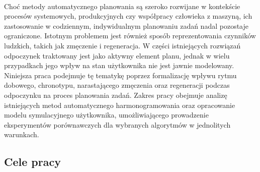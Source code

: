 \\\indent Choć metody automatycznego planowania są szeroko rozwijane w kontekście procesów systemowych, produkcyjnych czy współpracy człowieka z maszyną, ich zastosowanie w codziennym, indywidualnym planowaniu zadań nadal pozostaje ograniczone. Istotnym problemem jest również sposób reprezentowania czynników ludzkich, takich jak zmęczenie i regeneracja. W części istniejących rozwiązań odpoczynek traktowany jest jako aktywny element planu, jednak w wielu przypadkach jego wpływ na stan użytkownika nie jest jawnie modelowany.
\\\indent Niniejsza praca podejmuje tę tematykę poprzez formalizację wpływu rytmu dobowego, chronotypu, narastającego zmęczenia oraz regeneracji podczas odpoczynku na proces planowania zadań. Zakres pracy obejmuje analizę istniejących metod automatycznego harmonogramowania oraz opracowanie modelu symulacyjnego użytkownika, umożliwiającego prowadzenie eksperymentów porównawczych dla wybranych algorytmów w jednolitych warunkach.

\subsection{Cele pracy}\label{section_goals}

